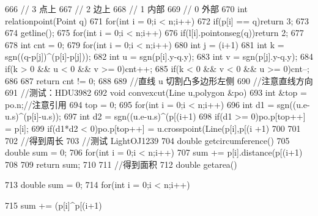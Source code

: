 \documentclass[11pt]{article}
\begin{document}
\begin{Code}
{666       // 3 点上
667       // 2 边上
668       // 1 内部
669       // 0 外部
670       int relationpoint(Point q){
671           for(int i = 0;i < n;i++){
672               if(p[i] == q)return 3;
673           }
674           getline();
675           for(int i = 0;i < n;i++){
676               if(l[i].pointonseg(q))return 2;
677           }
678           int cnt = 0;
679           for(int i = 0;i < n;i++){
680               int j = (i+1)%
681               int k = sgn((q-p[j])^(p[i]-p[j]));
682               int u = sgn(p[i].y-q.y);
683               int v = sgn(p[j].y-q.y);
684               if(k > 0 && u < 0 && v >= 0)cnt++;
685               if(k < 0 && v < 0 && u >= 0)cnt--;
686           }
687           return cnt != 0;
688       }
689       //直线 u 切割凸多边形左侧
690       //注意直线方向
691       //测试：HDU3982
692       void convexcut(Line u,polygon &po){
693           int &top = po.n;//注意引用
694           top = 0;
695           for(int i = 0;i < n;i++){
696               int d1 = sgn((u.e-u.s)^(p[i]-u.s));
697               int d2 = sgn((u.e-u.s)^(p[(i+1)%
698               if(d1 >= 0)po.p[top++] = p[i];
699               if(d1*d2 < 0)po.p[top++] = u.crosspoint(Line(p[i],p[(i
                     +1)%
700           }
701       }
702       //得到周长
703       //测试 LightOJ1239
704       double getcircumference(){
705           double sum = 0;
706           for(int i = 0;i < n;i++){
707               sum += p[i].distance(p[(i+1)%
708           }
709           return sum;
710       }
711       //得到面积
712       double getarea(){
713           double sum = 0;
714           for(int i = 0;i < n;i++){
715               sum += (p[i]^p[(i+1)%


}}}
\end{Code}
\end{document}
